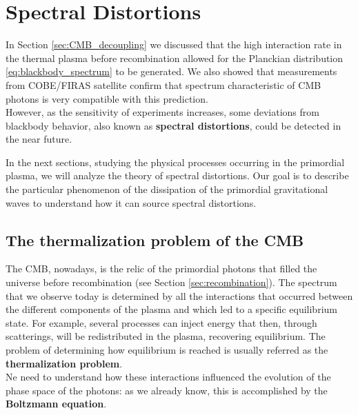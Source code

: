 \chapter{Spectral Distortions}
\label{chap:SpectralDistortions}
In Section \ref{sec:CMB_decoupling} we discussed that the high interaction rate in the thermal plasma before recombination allowed for the Planckian distribution \eqref{eq:blackbody_spectrum} to be generated. We also showed that measurements from COBE/FIRAS satellite \cite{COBE1996} confirm that spectrum characteristic of CMB photons is very compatible with this prediction.\\
However, as the sensitivity of experiments increases, some deviations from blackbody behavior, also known as \textbf{spectral distortions}, could be detected in the near future.

In the next sections, studying the physical processes occurring in the primordial plasma, we will analyze the theory of spectral distortions. Our goal is to describe the particular phenomenon of the dissipation of the primordial gravitational waves to understand how it can source spectral distortions. 
\section{The thermalization problem of the CMB}\label{sec:ThermalizationProblem}
The CMB, nowadays, is the relic of the primordial photons that filled the universe before recombination (see Section \ref{sec:recombination}). The spectrum that we observe today is determined by all the interactions that occurred between the different components of the plasma and which led to a specific equilibrium state. For example, several processes can inject energy that then, through scatterings, will be redistributed in the plasma, recovering equilibrium. The problem of determining how equilibrium is reached is usually referred as the \textbf{thermalization problem}.\\
Ne need to understand how these interactions influenced the evolution of the phase space of the photons: as we already know, this is accomplished by the \textbf{Boltzmann equation}.

